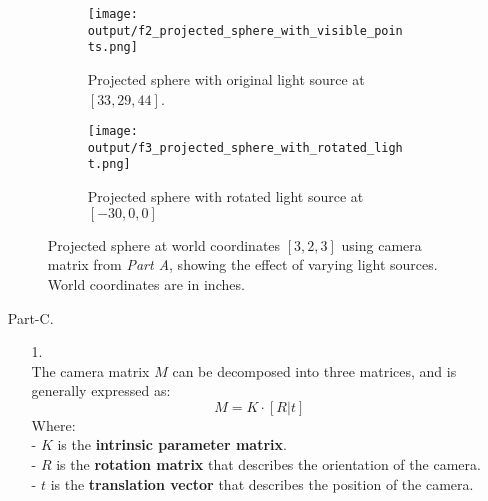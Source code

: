 \documentclass[12pt]{report}
\begin{document}
\begin{enumerate}
    \begin{figure}[!ht]\centering
        \begin{subfigure}{0.6\textwidth}
            \texttt{[image: output/f2\_projected\_sphere\_with\_visible\_points.png]}
            \caption{Projected sphere with original light source at $[33, 29, 44]$.}
            \label{fig:Figure2a}
        \end{subfigure}
    \vfil
        \begin{subfigure}{0.6\textwidth}
        \texttt{[image: output/f3\_projected\_sphere\_with\_rotated\_light.png]}
        \caption{Projected sphere with rotated light source at $[-30, 0, 0]$}
        \label{fig:Figure2b}
        \end{subfigure}
        \caption{Projected sphere at world coordinates $[3,2,3]$ using camera matrix from \emph{Part A}, 
        showing the effect of varying light sources. World coordinates are in inches.}
        \label{fig:Figure2}
    \end{figure}

    \FloatBarrier 

    \item[Part-C.]
    \ \\
    \begin{enumerate}
    \item[1.]
    \ \\
    The camera matrix \( M \) can be decomposed into three matrices, and is generally expressed as:
    $$
    M = K \cdot [R | t]
    $$
    Where:\\
    - \( K \) is the \textbf{intrinsic parameter matrix}.\\
    - \( R \) is the \textbf{rotation matrix} that describes the orientation of the camera.\\
    - \( t \) is the \textbf{translation vector} that describes the position of the camera.
    

\end{enumerate}
\end{enumerate}
\end{document}
